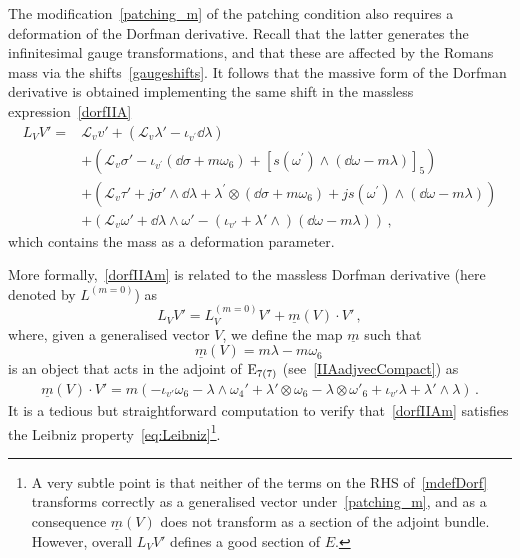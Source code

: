 \documentclass[debug]{phd}
\begin{document}
						The modification~\eqref{patching_m} of the patching condition also requires a deformation of the Dorfman derivative. 
						Recall that the latter generates the infinitesimal gauge transformations, and that these are affected by the Romans mass via the shifts~\eqref{gaugeshifts}. 
						It follows that the massive form of the Dorfman derivative is obtained implementing the same shift in the massless expression~\eqref{dorfIIA}
								\begin{equation}\label{dorfIIAm}
									\begin{split}
										L_V V' =& \mathcal{L}_v v' + \left(\mathcal{L}_v \lambda' - \iota_{v^\prime} \dd\lambda\right) \\
												& + \left( \mathcal{L}_v \sigma' - \iota_{v^\prime}(\dd\sigma+m\omega_6) + [s(\omega^\prime) \wedge (\dd\omega-m\lambda)]_5\right) \\
												& + \left(\mathcal{L}_v \tau' + j \sigma' \wedge \dd\lambda + \lambda^\prime \otimes (\dd\sigma+m\omega_6) + j s(\omega^\prime) \wedge (\dd\omega-m\lambda) \right) \\
												& + \left(\mathcal{L}_v \omega' + \dd \lambda \wedge \omega' - (\iota_{v'}+ \lambda' \wedge)(\dd\omega-m\lambda)\right)\, ,
									\end{split}
								\end{equation}
						which contains the mass as a deformation parameter. 
						
						More formally,~\eqref{dorfIIAm} is related to the massless Dorfman derivative (here denoted by $L^{(m=0)}$) as
								\begin{equation}\label{mdefDorf}
									L_V V' = L^{(m=0)}_V V' + \underline{m}(V) \cdot V'\,,
								\end{equation}
						where, given a generalised vector $V$, we define the map $\underline{m}$ such that
								\begin{equation}
									\underline{m}(V) = m\lambda - m \omega_6 \, 
								\end{equation}
						is an object that acts in the adjoint of $\mathrm{E}_{7(7)}$ (see~\eqref{IIAadjvecCompact}) as
								\begin{equation}\label{madj}
									\begin{split}
										\underline{m}(V)\cdot V' = m \left( - \iota_{v'} \omega_6 - \lambda \wedge \omega_4' + \lambda' \otimes \omega_6 - \lambda \otimes \omega'_6 + \iota_{v'} \lambda + \lambda' \wedge \lambda\right)\,.
									\end{split}
								\end{equation}
						It is a tedious but straightforward computation to verify that~\eqref{dorfIIAm} satisfies the Leibniz property~\eqref{eq:Leibniz}\footnote{%
							A very subtle point is that neither of the terms on the RHS of~\eqref{mdefDorf} transforms correctly as a generalised vector under~\eqref{patching_m}, and as a consequence $\underline{m}(V)$ does not transform as a section of the adjoint bundle. However, overall $L_V V'$ defines a good section of $E$.%
							}.
\end{document}
